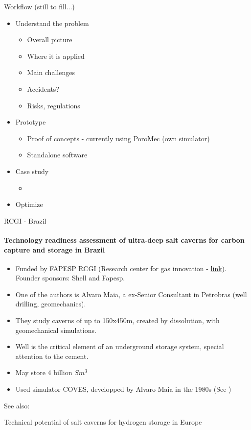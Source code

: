 \begin{frame}{Workflow (still to fill...)}
\begin{itemize}
\item Understand the problem
	\begin{itemize}
		\item Overall picture
		\item Where it is applied
		\item Main challenges
		\item Accidents?
		\item Risks, regulations
    \end{itemize}
\item Prototype
	\begin{itemize}
		\item Proof of concepts - currently using PoroMec (own simulator)
		\item Standalone software
	\end{itemize}
\item Case study
	\begin{itemize}
		\item 
	\end{itemize}
\item Optimize
\end{itemize}

\end{frame}

\begin{frame}{RCGI - Brazil}
\framesubtitle{\cite{goulart20} Technology readiness assessment of ultra-deep salt caverns for carbon capture and storage in Brazil}
\begin{itemize}
\item Funded by FAPESP RCGI (Research center for gas innovation - \href{https://sites.usp.br/rcgi/br/rgci_br/}{link}). Founder sponsors: Shell and Fapesp.
\item One of the authors is Alvaro Maia, a ex-Senior Consultant in Petrobras (well drilling, geomechanics).
\item They study caverns of up to 150x450m, created by dissolution, with geomechanical simulations.
\item Well is the critical element of an underground storage system, special attention to the cement.
\item May store 4 billion $Sm^3$
\item Used simulator COVES, developped by Alvaro Maia in the 1980s (See \cite{maia1984})
\end{itemize}
See also: \cite{abreu23}
\end{frame}
%
%
\begin{frame}{\cite{caglayan2020}Technical potential of salt caverns for hydrogen storage in Europe}
\end{frame}


